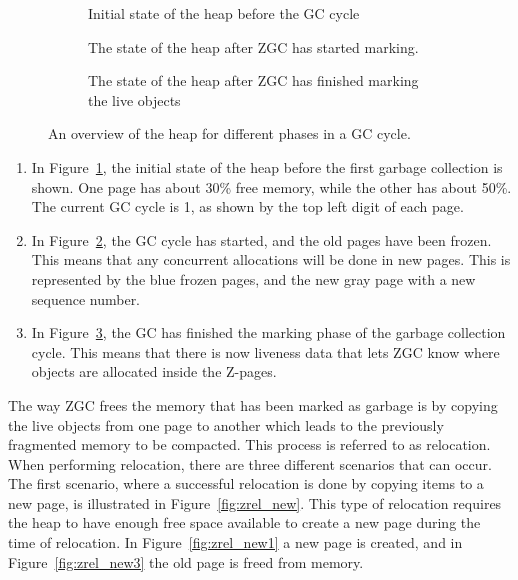 \begin{figure}[H]
    \centering
    \begin{subfigure}[t]{.214\textwidth}
        \centering
        
        \caption{Initial state of the heap before the GC cycle}
        \label{fig:zrel1}
    \end{subfigure}%
    \hfill\vline\hfill
    \begin{subfigure}[t]{.32\textwidth}
        \centering
        
        \caption{The state of the heap after ZGC has started marking.}
        \label{fig:zrel2}
    \end{subfigure}%
    \hfill\vline\hfill
    \begin{subfigure}[t]{.32\textwidth}
        \centering
        
        \caption{The state of the heap after ZGC has finished marking the live objects}
        \label{fig:zrel3}
    \end{subfigure}%
    \caption{An overview of the heap for different phases in a GC cycle.}
    \label{fig:zgc_timeline}
\end{figure}

\begin{enumerate}
    \item In Figure~\ref*{fig:zrel1}, the initial state of the heap before the first garbage collection is shown. One page has about 30\% free memory, while the other has about 50\%. The current GC cycle is 1, as shown by the top left digit of each page.
    \item In Figure~\ref*{fig:zrel2}, the GC cycle has started, and the old pages have been frozen. This means that any concurrent allocations will be done in new pages. This is represented by the blue frozen pages, and the new gray page with a new sequence number.
    \item In Figure~\ref*{fig:zrel3}, the GC has finished the marking phase of the garbage collection cycle. This means that there is now liveness data that lets ZGC know where objects are allocated inside the Z-pages.
\end{enumerate}

The way ZGC frees the memory that has been marked as garbage is by copying the live objects from one page to another which leads to the previously fragmented memory to be compacted. This process is referred to as relocation. When performing relocation, there are three different scenarios that can occur. The first scenario, where a successful relocation is done by copying items to a new page, is illustrated in Figure~\ref{fig:zrel_new}. This type of relocation requires the heap to have enough free space available to create a new page during the time of relocation. In Figure~\ref*{fig:zrel_new1} a new page is created, and in Figure~\ref*{fig:zrel_new3} the old page is freed from memory.

